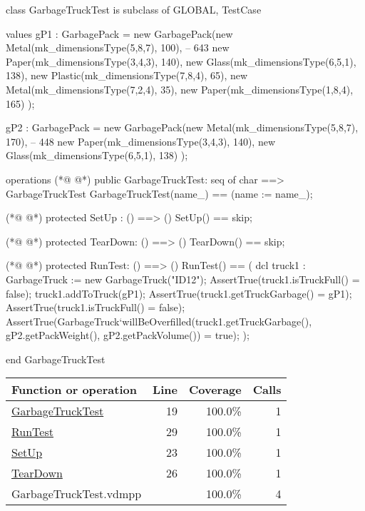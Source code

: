 \begin{vdmpp}[breaklines=true]
class GarbageTruckTest is subclass of GLOBAL, TestCase

values 
gP1 : GarbagePack = new GarbagePack({new Metal(mk_dimensionsType(5,8,7), 100), -- 643
                                     new Paper(mk_dimensionsType(3,4,3), 140),
                                     new Glass(mk_dimensionsType(6,5,1), 138),
                                     new Plastic(mk_dimensionsType(7,8,4), 65),
                                     new Metal(mk_dimensionsType(7,2,4), 35),
                                     new Paper(mk_dimensionsType(1,8,4), 165)
                                     });

gP2 : GarbagePack = new GarbagePack({new Metal(mk_dimensionsType(5,8,7), 170), -- 448
                                     new Paper(mk_dimensionsType(3,4,3), 140),
                                     new Glass(mk_dimensionsType(6,5,1), 138)
                                     });


operations
(*@
\label{GarbageTruckTest:19}
@*)
    public GarbageTruckTest: seq of char ==> GarbageTruckTest
    GarbageTruckTest(name_) ==
    (name := name_);

(*@
\label{SetUp:23}
@*)
    protected SetUp : () ==> ()
    SetUp() == skip;

(*@
\label{TearDown:26}
@*)
    protected TearDown: () ==> ()
    TearDown() == skip;

(*@
\label{RunTest:29}
@*)
    protected RunTest: () ==> ()
    RunTest() ==
    (
        dcl truck1 : GarbageTruck := new GarbageTruck("ID12");
        AssertTrue(truck1.isTruckFull() = false);
        truck1.addToTruck(gP1);
        AssertTrue(truck1.getTruckGarbage() = {gP1});
        AssertTrue(truck1.isTruckFull() = false);
        AssertTrue(GarbageTruck`willBeOverfilled(truck1.getTruckGarbage(), gP2.getPackWeight(), gP2.getPackVolume()) = true);
    );


end GarbageTruckTest
\end{vdmpp}
\bigskip
\begin{longtable}{|l|r|r|r|}
\hline
Function or operation & Line & Coverage & Calls \\
\hline
\hline
\hyperref[GarbageTruckTest:19]{GarbageTruckTest} & 19&100.0\% & 1 \\
\hline
\hyperref[RunTest:29]{RunTest} & 29&100.0\% & 1 \\
\hline
\hyperref[SetUp:23]{SetUp} & 23&100.0\% & 1 \\
\hline
\hyperref[TearDown:26]{TearDown} & 26&100.0\% & 1 \\
\hline
\hline
GarbageTruckTest.vdmpp & & 100.0\% & 4 \\
\hline
\end{longtable}

